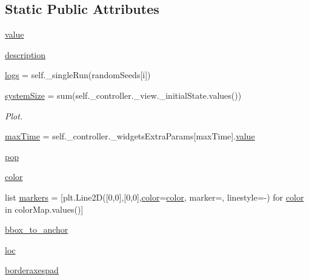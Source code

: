 \subsection*{Static Public Attributes}
\begin{DoxyCompactItemize}
\item 
\hyperlink{class_mu_mo_t_1_1_mu_mo_t_1_1_mu_mo_tview_afcc7a4b78ecd8fa7e713f8cfa0f51017}{value}
\item 
\hyperlink{class_mu_mo_t_1_1_mu_mo_t_1_1_mu_mo_tview_a2661f439a4a94ffdcd5e47ae1da0bb1d}{description}
\item 
\hyperlink{class_mu_mo_t_1_1_mu_mo_t_1_1_mu_mo_tview_a37d874d1d45bc2e5bfa013cddacb8e68}{logs} = self.\+\_\+single\+Run(random\+Seeds\mbox{[}i\mbox{]})
\item 
\hyperlink{class_mu_mo_t_1_1_mu_mo_t_1_1_mu_mo_tview_a69ffe654c8e97fdcbffcf35a1ded8157}{system\+Size} = sum(self.\+\_\+controller.\+\_\+view.\+\_\+initial\+State.\+values())
\begin{DoxyCompactList}\small\item\em Plot. \end{DoxyCompactList}\item 
\hyperlink{class_mu_mo_t_1_1_mu_mo_t_1_1_mu_mo_tview_aa820f7e11b025b06f4eeb0ad7581ad34}{max\+Time} = self.\+\_\+controller.\+\_\+widgets\+Extra\+Params\mbox{[}\textquotesingle{}max\+Time\textquotesingle{}\mbox{]}.\hyperlink{class_mu_mo_t_1_1_mu_mo_t_1_1_mu_mo_tview_afcc7a4b78ecd8fa7e713f8cfa0f51017}{value}
\item 
\hyperlink{class_mu_mo_t_1_1_mu_mo_t_1_1_mu_mo_tview_a23acc33d21869c517c7eb8114b3d8072}{pop}
\item 
\hyperlink{class_mu_mo_t_1_1_mu_mo_t_1_1_mu_mo_tview_a37dbdc30935031c05304482e1be89d8f}{color}
\item 
list \hyperlink{class_mu_mo_t_1_1_mu_mo_t_1_1_mu_mo_tview_a6a57a88c0fcb681f5721c6b1bce2dd96}{markers} = \mbox{[}plt.\+Line2D(\mbox{[}0,0\mbox{]},\mbox{[}0,0\mbox{]},\hyperlink{class_mu_mo_t_1_1_mu_mo_t_1_1_mu_mo_tview_a37dbdc30935031c05304482e1be89d8f}{color}=\hyperlink{class_mu_mo_t_1_1_mu_mo_t_1_1_mu_mo_tview_a37dbdc30935031c05304482e1be89d8f}{color}, marker=\textquotesingle{}\textquotesingle{}, linestyle=\textquotesingle{}-\/\textquotesingle{}) for \hyperlink{class_mu_mo_t_1_1_mu_mo_t_1_1_mu_mo_tview_a37dbdc30935031c05304482e1be89d8f}{color} in color\+Map.\+values()\mbox{]}
\item 
\hyperlink{class_mu_mo_t_1_1_mu_mo_t_1_1_mu_mo_tview_a411167eeca51189fabe03f884c7bf92c}{bbox\+\_\+to\+\_\+anchor}
\item 
\hyperlink{class_mu_mo_t_1_1_mu_mo_t_1_1_mu_mo_tview_aeee9f371db14fda0de35d16324a167df}{loc}
\item 
\hyperlink{class_mu_mo_t_1_1_mu_mo_t_1_1_mu_mo_tview_a15c45102c35a6e8e18adffce8cfdb703}{borderaxespad}
\end{DoxyCompactItemize}
